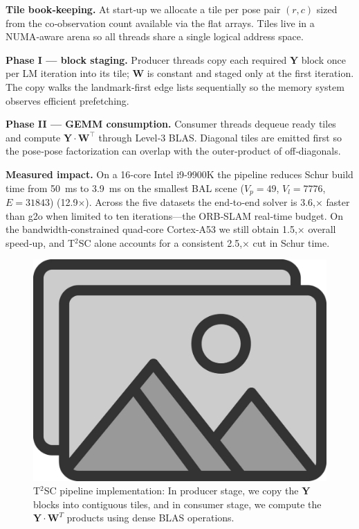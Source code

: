 \textbf{Tile book‑keeping.} At start‑up we allocate a tile per pose pair $(r,c)$ sized from the
co‑observation count available via the flat arrays. Tiles live in a NUMA‑aware arena so all threads
share a single logical address space.

\textbf{Phase I — block staging.} Producer threads copy each required $\mathbf Y$ block once per
LM iteration into its tile; $\mathbf W$ is constant and staged only at the first iteration. The copy
walks the landmark‑first edge lists sequentially so the memory system observes efficient
prefetching.

\textbf{Phase II — GEMM consumption.} Consumer threads dequeue ready tiles and compute
$\mathbf Y \cdot \mathbf W^{\top}$ through Level‑3 BLAS. Diagonal tiles are emitted first so the
pose‑pose factorization can overlap with the outer‑product of off‑diagonals.

\textbf{Measured impact.} On a 16‑core Intel i9‑9900K the pipeline reduces Schur build time from
\SI{50}{\milli\second} to \SI{3.9}{\milli\second} on the smallest BAL scene 
($V_p=49$, $V_l=7776$, $E=31843$) (12.9$\times$). Across the five
datasets the end‑to‑end solver is 3.6,× faster than g2o when limited to ten iterations—the ORB‑SLAM
real‑time budget. On the bandwidth‑constrained quad‑core Cortex‑A53 we still obtain 1.5,× overall
speed‑up, and T$^{2}$SC alone accounts for a consistent 2.5,× cut in Schur time.

\begin{figure}[t]
  \centering
  \includegraphics[width=0.75\linewidth]{figs/placeholder}
  \caption{T$^2$SC pipeline implementation: In producer stage, we copy the $\mathbf{Y}$ blocks
  into contiguous tiles, and in consumer stage, we compute the $\mathbf{Y} \cdot \mathbf{W}^T$ products
  using dense BLAS operations.}
  \label{fig:t2sc_pipeline}
\end{figure}

